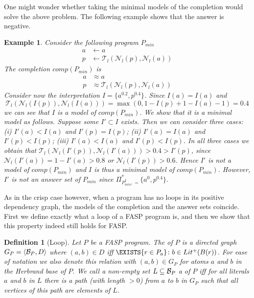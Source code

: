 \documentclass{tlp}
\newcommand{\hbase}[1]{{\ensuremath{{\cal B}_{#1}}}}
\newcommand{\body}[1]{\ensuremath{B(#1)}}
\newcommand{\comp}[1]{\ensuremath{comp(#1)}}
\newcommand{\poslit}[1]{\ensuremath{Lit^{+}(#1)}}
\newcommand{\depgraph}[1]{\ensuremath{G_{#1}}}
\newcommand{\fneg}[2]{\ensuremath{\mathcal{N}_{#1}(#2)}}
\newcommand{\lneg}[1]{\fneg{l}{#1}}
\newcommand{\feq}{\ensuremath{\approx}}
\newcommand{\pretnorm}{\mathcal{T}}
\newcommand{\tuple}[1]{\ensuremath{\langle{#1}\rangle}}
\newcommand{\SUCHTHAT}{\colon}
\newcommand{\Exists}[2]{\ensuremath{\EXISTS{#1} \SUCHTHAT {#2}}}
\newcommand{\lfpimcons}[2]{\esm{\Pi^*_{#1,#2}}}
\newtheorem{definition}{Definition}
\newtheorem{example}{Example}
\newcommand{\esm}[1]{\ensuremath{#1}}	\newcommand{\mc}[1]{\mathcal{#1}}
\begin{document}
One might wonder whether taking the minimal models of the completion would solve the above problem. The following example shows that the answer is negative.

\begin{example}\label{ex:progmin}
 Consider the following program $P_{\mathit{min}}$
 \begin{align*}
  a &\gets a\\
  p &\gets \pretnorm_l(\lneg{p},\lneg{a})
 \end{align*}
 \noindent The completion $\comp{P_{\mathit{min}}}$ is
 \begin{align*}
  a &\feq a\\
  p &\feq \pretnorm_l(\lneg{p},\lneg{a})
 \end{align*}
 \noindent Consider now the interpretation $I = \{a^{0.2},p^{0.4}\}$. Since $I(a) = I(a)$ and 
  $$\pretnorm_l(\lneg{I(p)},\lneg{I(a)}) = \max(0,1-I(p) + 1-I(a) -1) = 0.4$$
 we can see that $I$ is a model of $\comp{P_{\mathit{min}}}$. We show that it is a minimal model as follows. Suppose some $I' \subset I$ exists. Then we can consider three cases: (i) $I'(a) < I(a)$ and $I'(p) = I(p)$; (ii) $I'(a) = I(a)$ and $I'(p) < I(p)$; (iii) $I'(a) < I(a)$ and $I'(p) < I(p)$. In all three cases we obtain that $\pretnorm_l(\lneg{I'(p)},\lneg{I'(a)}) > 0.4 > I'(p)$, since $\lneg{I'(a)} = 1-I'(a) > 0.8$ or $\lneg{I'(p)} > 0.6$. Hence $I'$ is not a model of $\comp{P_{\mathit{min}}}$ and $I$ is thus a minimal model of $\comp{P_{\mathit{min}}}$.
 However, $I'$ is not an answer set of $P_{\mathit{min}}$ since $\lfpimcons{P_{\mathit{min}}^I} = \{a^0,p^{0.4}\}$.
\end{example}




As in the crisp case however, when a program has no loops in its positive dependency graph, the models of the completion and the answer sets coincide. First we define exactly what a loop of a FASP program is, and then we show that this property indeed still holds for FASP.

\begin{definition}[Loop]\label{def:loop}
 Let $P$ be a FASP program. The  of $P$ is a directed graph $\depgraph{P} = \tuple{\hbase{P},D}$ where $(a,b) \in D$ iff $\Exists{r \in P_a}{b \in \poslit{\body{r}}}$. For ease of notation we also denote this relation with $(a,b) \in \depgraph{P}$ for atoms $a$ and $b$ in the Herbrand base of $P$. We call a non-empty set $L \subseteq\hbase{P}$ a  of $P$ iff for all literals $a$ and $b$ in $L$ there is a path (with length $> 0$) from $a$ to $b$ in $\depgraph{P}$ such that all vertices of this path are elements of $L$.
\end{definition}
\end{document}
